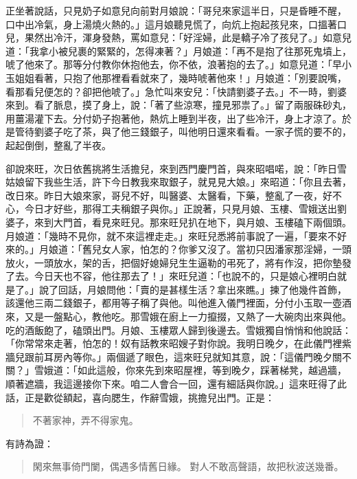 正坐著說話，只見奶子如意兒向前對月娘說：「哥兒來家這半日，只是昏睡不醒，口中出冷氣，身上湯燒火熱的。」這月娘聽見慌了，向炕上抱起孩兒來，口搵著口兒，果然出冷汗，渾身發熱，罵如意兒：「好淫婦，此是轎子冷了孩兒了。」如意兒道：「我拿小被兒裹的緊緊的，怎得凍著？」月娘道：「再不是抱了往那死鬼墳上，唬了他來了。那等分付教你休抱他去，你不依，浪著抱的去了。」如意兒道：「早小玉姐姐看著，只抱了他那裡看看就來了，幾時唬著他來！」月娘道：「別要說嘴，看那看兒便怎的？卻把他唬了。」急忙叫來安兒：「快請劉婆子去。」不一時，劉婆來到。看了脈息，摸了身上，說：「著了些涼寒，撞見邪祟了。」留了兩服硃砂丸，用薑湯灌下去。分付奶子抱著他，熱炕上睡到半夜，出了些冷汗，身上才涼了。於是管待劉婆子吃了茶，與了他三錢銀子，叫他明日還來看看。一家子慌的要不的，起起倒倒，整亂了半夜。

卻說來旺，次日依舊挑將生活擔兒，來到西門慶門首，與來昭唱喏，說：「昨日雪姑娘留下我些生活，許下今日教我來取銀子，就見見大娘。」來昭道：「你且去著，改日來。昨日大娘來家，哥兒不好，叫醫婆、太醫看，下藥，整亂了一夜，好不心，今日才好些，那得工夫稱銀子與你。」正說著，只見月娘、玉樓、雪娥送出劉婆子，來到大門首，看見來旺兒。那來旺兒扒在地下，與月娘、玉樓磕下兩個頭。月娘道：「幾時不見你，就不來這裡走走。」來旺兒悉將前事說了一遍，「要來不好來的。」月娘道：「舊兒女人家，怕怎的？你爹又沒了。當初只因潘家那淫婦，一頭放火，一頭放水，架的舌，把個好媳婦兒生生逼勒的弔死了，將有作沒，把你墊發了去。今日天也不容，他往那去了！」來旺兒道：「也說不的，只是娘心裡明白就是了。」說了回話，月娘問他：「賣的是甚樣生活？拿出來瞧。」揀了他幾件首飾，該還他三兩二錢銀子，都用等子稱了與他。叫他進入儀門裡面，分付小玉取一壺酒來，又是一盤點心，教他吃。那雪娥在廚上一力攛掇，又熱了一大碗肉出來與他。吃的酒飯飽了，磕頭出門。月娘、玉樓眾人歸到後邊去。雪娥獨自悄悄和他說話：「你常常來走著，怕怎的！奴有話教來昭嫂子對你說。我明日晚夕，在此儀門裡紫牆兒跟前耳房內等你。」兩個遞了眼色，這來旺兒就知其意，說：「這儀門晚夕關不關？」雪娥道：「如此這般，你來先到來昭屋裡，等到晚夕，踩著梯凳，越過牆，順著遮牆，我這邊接你下來。咱二人會合一回，還有細話與你說。」這來旺得了此話，正是歡從額起，喜向腮生，作辭雪娥，挑擔兒出門。正是：
\begin{quote}
不著家神，弄不得家鬼。
\end{quote}
有詩為證：
\begin{quote}
閑來無事倚門闌，偶遇多情舊日緣。
對人不敢高聲語，故把秋波送幾番。
\end{quote}

